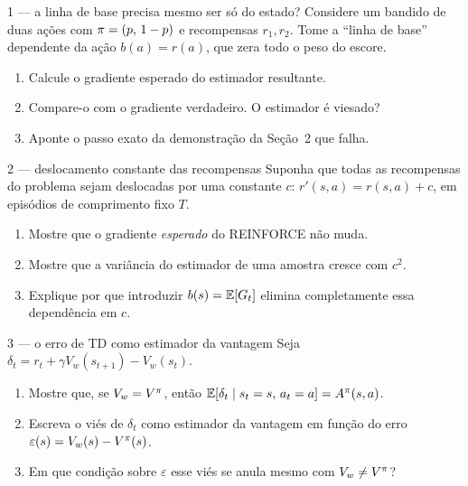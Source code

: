 \documentclass[11pt, a4paper]{article}
\newcommand{\Adv}{A}
\begin{document}
\begin{exbox}{1 — a linha de base precisa mesmo ser só do estado?}
Considere um bandido de duas ações com $\pi = (p,\, 1-p)$ e recompensas
$r_1, r_2$. Tome a ``linha de base'' dependente da ação
$b(a) = r(a)$, que zera todo o peso do escore.
\begin{enumerate}[label=(\alph*)]
  \item Calcule o gradiente esperado do estimador resultante.
  \item Compare-o com o gradiente verdadeiro. O estimador é viesado?
  \item Aponte o passo exato da demonstração da Seção~2 que falha.
\end{enumerate}
\end{exbox}

\begin{exbox}{2 — deslocamento constante das recompensas}
Suponha que todas as recompensas do problema sejam deslocadas por uma constante
$c$: $r'(s,a) = r(s,a) + c$, em episódios de comprimento fixo $T$.
\begin{enumerate}[label=(\alph*)]
  \item Mostre que o gradiente \emph{esperado} do REINFORCE não muda.
  \item Mostre que a variância do estimador de uma amostra cresce com $c^2$.
  \item Explique por que introduzir $b(s) = \mathbb{E}[G_t]$ elimina completamente essa
        dependência em $c$.
\end{enumerate}
\end{exbox}

\begin{exbox}{3 — o erro de TD como estimador da vantagem}
Seja $\delta_t = r_t + \gamma V_w(s_{t+1}) - V_w(s_t)$.
\begin{enumerate}[label=(\alph*)]
  \item Mostre que, se $V_w = V^{\pi}$, então
        $\E\!\left[\delta_t \mid s_t = s,\, a_t = a\right] = \Adv^{\pol}(s,a)$.
  \item Escreva o viés de $\delta_t$ como estimador da vantagem em função do
        erro $\varepsilon(s) = V_w(s) - V^{\pi}(s)$.
  \item Em que condição sobre $\varepsilon$ esse viés se anula mesmo com
        $V_w \ne V^{\pi}$?
\end{enumerate}
\end{exbox}
\end{document}
